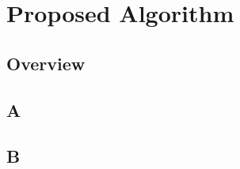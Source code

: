 \section{Proposed Algorithm}
\label{sec:techique}

\subsection{Overview}

\subsection{A}

\subsection{B}
